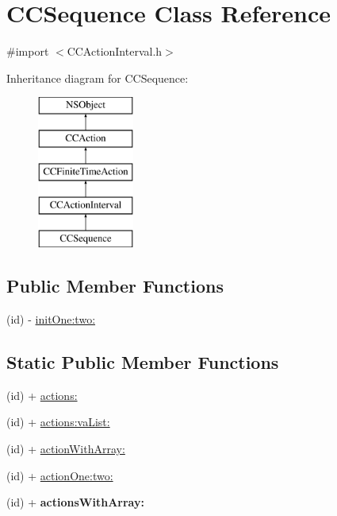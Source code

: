 \hypertarget{interface_c_c_sequence}{\section{C\-C\-Sequence Class Reference}
\label{interface_c_c_sequence}
}


{\ttfamily \#import $<$C\-C\-Action\-Interval.\-h$>$}

Inheritance diagram for C\-C\-Sequence\-:\begin{figure}[H]
\begin{center}
\leavevmode
\includegraphics[height=5.000000cm]{interface_c_c_sequence}
\end{center}
\end{figure}
\subsection*{Public Member Functions}
\begin{DoxyCompactItemize}
\item 
(id) -\/ \hyperlink{interface_c_c_sequence_a1673575f39ca5ac6dbda7c0a43649dfc}{init\-One\-:two\-:}
\end{DoxyCompactItemize}
\subsection*{Static Public Member Functions}
\begin{DoxyCompactItemize}
\item 
(id) + \hyperlink{interface_c_c_sequence_a8ee2b8d75923c9a3bb01378128021876}{actions\-:}
\item 
(id) + \hyperlink{interface_c_c_sequence_aa41494fe0880e980e33874f112afac86}{actions\-:va\-List\-:}
\item 
(id) + \hyperlink{interface_c_c_sequence_a24ae87c819dc1e4db65bde4de7b064f2}{action\-With\-Array\-:}
\item 
(id) + \hyperlink{interface_c_c_sequence_a91ba9a177ec53d42c4a2ad9af667f7ca}{action\-One\-:two\-:}
\item 
\hypertarget{interface_c_c_sequence_a98cf40c4f25f226631e204f476c48c93}{(id) + {\bfseries actions\-With\-Array\-:}}\label{interface_c_c_sequence_a98cf40c4f25f226631e204f476c48c93}

\end{DoxyCompactItemize}
